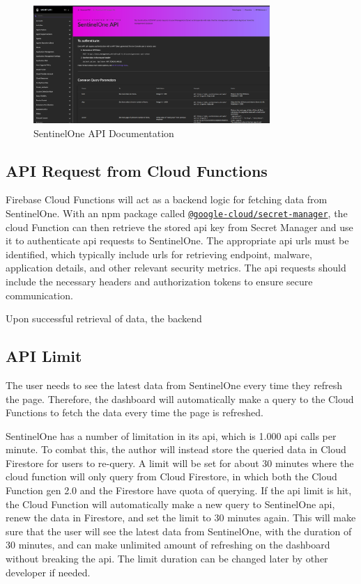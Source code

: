\begin{figure}[htbp]
      \centering
      \includegraphics[width=0.8\textwidth]{Figures/SentinelOne/API Doc.png}
      \caption{SentinelOne API Documentation}
\end{figure}

\subsection{API Request from Cloud Functions}

Firebase Cloud Functions will act as a backend logic for fetching data from SentinelOne. With an \acrshort{npm} package called
\href{https://www.npmjs.com/package/@google-cloud/secret-manager}{\texttt{@google-cloud/secret-manager}}, the cloud Function
can then retrieve the stored \acrshort{api} key from Secret Manager and use it to authenticate \acrshort{api} requests to SentinelOne.
The appropriate \acrshort{api} \acrshort{url}s must be identified, which typically include \acrshort{url}s for retrieving endpoint,
malware, application details, and other relevant security metrics. The \acrshort{api} requests should include the necessary headers and
authorization tokens to ensure secure communication.

Upon successful retrieval of data, the backend

\subsection{API Limit}

The user needs to see the latest data from SentinelOne every time they refresh the page. Therefore, the dashboard will automatically
make a query to the Cloud Functions to fetch the data every time the page is refreshed.

SentinelOne has a number of limitation in its \acrshort{api}, which is 1.000 \acrshort{api} calls per minute. To combat this, the author
will instead store the queried data in Cloud Firestore for users to re-query. A limit will be set for about 30 minutes where the cloud
function will only query from Cloud Firestore, in which both the Cloud Function gen 2.0 and the Firestore have quota of querying. If
the \acrshort{api} limit is hit, the Cloud Function will automatically make a new query to SentinelOne \acrshort{api}, renew the data
in Firestore, and set the limit to 30 minutes again. This will make sure that the user will see the latest data from SentinelOne, with
the duration of 30 minutes, and can make unlimited amount of refreshing on the dashboard without breaking the \acrshort{api}. The limit
duration can be changed later by other developer if needed.


